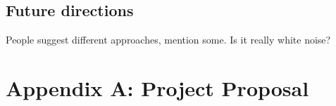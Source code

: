 \documentclass[12pt,british,twoside,notitlepage,usenames,dvipsnames,hypens,final]{report}
\numberwithin{equation}{section}
\numberwithin{figure}{section}
\begin{document}
\section{Future directions}

People suggest different approaches, mention some. Is it really white noise?

\cleardoublepage



\appendix
\cleardoublepage
{}
\chapter*{Appendix A: Project Proposal}


\end{document}

